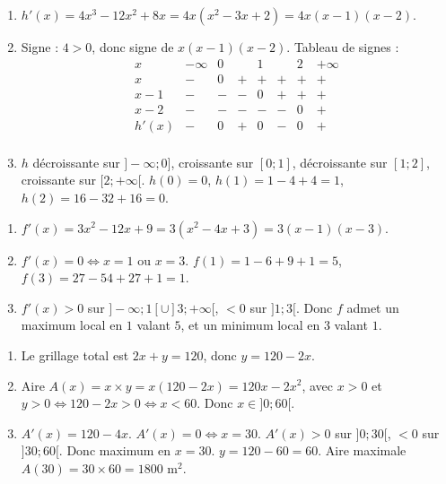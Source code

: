 \begin{enumerate}[label=\alph*)]
\item $h'(x)=4x^3-12x^2+8x=4x(x^2-3x+2)=4x(x-1)(x-2)$.
\item Signe : $4>0$, donc signe de $x(x-1)(x-2)$. Tableau de signes :
\[
\begin{array}{c|ccccccc}
x & -\infty & 0 & & 1 & & 2 & +\infty \\
\hline
x & - & 0 & + & + & + & + & + \\
x-1 & - & - & - & 0 & + & + & + \\
x-2 & - & - & - & - & - & 0 & + \\
\hline
h'(x) & - & 0 & + & 0 & - & 0 & + \\
\end{array}
\]
\item $h$ décroissante sur $]-\infty;0]$, croissante sur $[0;1]$, décroissante sur $[1;2]$, croissante sur $[2;+\infty[$. $h(0)=0$, $h(1)=1-4+4=1$, $h(2)=16-32+16=0$.
\end{enumerate}

\begin{enumerate}[label=\alph*)]
\item $f'(x)=3x^2-12x+9=3(x^2-4x+3)=3(x-1)(x-3)$.
\item $f'(x)=0 \iff x=1$ ou $x=3$. $f(1)=1-6+9+1=5$, $f(3)=27-54+27+1=1$.
\item $f'(x)>0$ sur $]-\infty;1[\cup]3;+\infty[$, $<0$ sur $]1;3[$. Donc $f$ admet un maximum local en $1$ valant $5$, et un minimum local en $3$ valant $1$.
\end{enumerate}

\begin{enumerate}[label=\alph*)]
\item Le grillage total est $2x+y=120$, donc $y=120-2x$.
\item Aire $A(x)=x\times y=x(120-2x)=120x-2x^2$, avec $x>0$ et $y>0 \iff 120-2x>0 \iff x<60$. Donc $x\in]0;60[$.
\item $A'(x)=120-4x$. $A'(x)=0 \iff x=30$. $A'(x)>0$ sur $]0;30[$, $<0$ sur $]30;60[$. Donc maximum en $x=30$. $y=120-60=60$. Aire maximale $A(30)=30\times60=1800$ m$^2$.
\end{enumerate}

